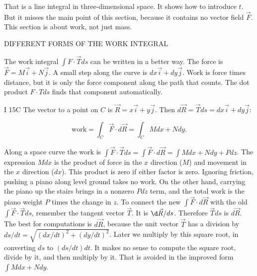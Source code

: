 That is a line integral in three-dimensional space. It shows how to introduce $t$. But
it misses the main point of this section, because it contains no vector field $\vec F$. This
section is about work, not just mass.

DIFFERENT FORMS OF THE WORK INTEGRAL

The work integral $\int F \cdot \vec T ds$ can be written in a better way. The force is $\vec F = M\vec i + N\vec j$.
A small step along the curve is $dx \vec i + dy \vec j$. Work is force times distance, but it is only
the force component along the path that counts. The dot product $F\cdot T ds$ finds that
component automatically. 

I 15C The vector to a point on $C$ is $\vec R = x\vec i + y\vec j$. Then $d\vec R = \vec T ds = dx \vec i + dy \vec j$:

$$\text{work}=\int_C\vec F \cdot d\vec R=\int_C M dx+N dy.$$ 

Along a space curve the work is $\int \vec F \cdot \vec T ds=\int \vec F \cdot d \vec R=\int M dx+N dy +P dz$.
The expression $M dx$ is the product of force in the $x$ direction ($M$) and movement in the $x$ direction ($dx$). This product is zero if
either factor is zero. Ignoring friction, pushing a piano along level ground takes no work.
On the other hand, carrying the piano up the stairs brings in a nonzero $P dz$ term, and the total
work is the piano weight $P$ times the change in $z$.
To connect the new $\int \vec F \cdot d\vec R$ with the old $\int \vec F \cdot \vec T ds$, remember the tangent vector
$\vec T$. It is $\d\vec R/ds$. Therefore $\vec T ds$ is $d\vec R$. The best for computations is $d\vec R$, because the
unit vector $\vec T$ has a division by $ds/dt = \sqrt{(dx/dt)^2 + (dy/dt)^2}$. Later we multiply by this
square root, in converting $ds$ to $(ds/dt)dt$. It makes no sense to compute the square
root, divide by it, and then multiply by it. That is avoided in the improved form
$\int Mdx+Ndy$.

